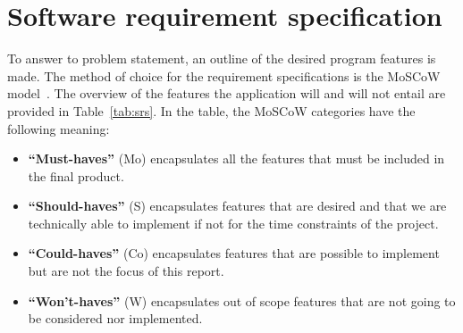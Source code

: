 \section{Software requirement specification}\label{sec:software-requirement-specification}

To answer to problem statement, an outline of the desired program features is made.
The method of choice for the requirement specifications is the MoSCoW model~\cite{hudaib2018}.
The overview of the features the application will and will not entail are provided in Table~\ref{tab:srs}.
In the table, the MoSCoW categories have the following meaning:

\begin{itemize}
    \item \textbf{``Must-haves''} (Mo) encapsulates all the features that must be
    included in the final product.
    \item \textbf{``Should-haves''} (S) encapsulates features that are desired and that we are technically able to
    implement if not for the time constraints of the project.
    \item \textbf{``Could-haves''} (Co) encapsulates features that are possible
    to implement but are not the focus of this report.
    \item \textbf{``Won't-haves''} (W) encapsulates out of scope features that are not going to be considered nor
    implemented.
\end{itemize}

